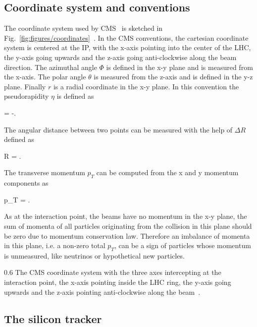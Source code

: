\subsection{Coordinate system and conventions}


The coordinate system used by CMS~\cite{Chatrchyan:2008zzk} is sketched in Fig.~\ref{fig:figures/coordinates}~\cite{Pantaleo:2293435}. In the CMS conventions, the cartesian coordinate system is centered at the IP, with the x-axis pointing into the center of the LHC, the y-axis going upwards and the z-axis going anti-clockwise along the beam direction. The azimuthal angle $\Phi$ is defined in the x-y plane and is measured from the x-axis. The polar angle $\theta$ is measured from the z-axis and is defined in the y-z plane. Finally $r$ is a radial coordinate in the x-y plane. In this convention the pseudorapidity $\eta$ is defined as

{
    \eta =  -\ln {}.
}

The angular distance between two points can be measured with the help of $\Delta R$ defined as

{
    \Delta R = .
}


The transverse momentum $p_{T}$ can be computed from the x and y momentum components as

{
    p_{T} =  .
}

As at the interaction point, the beams have no momentum in the x-y plane, the sum of momenta of all particles originating from the collision in this plane should be zero due to momentum conservation law. Therefore an imbalance of momenta in this plane, i.e. a non-zero total $p_{T}$, can be a sign of particles whose momentum is unmeasured, like neutrinos or hypothetical new particles. 

                 {0.6}       %
                 { The CMS coordinate system with the three axes intercepting at the interaction point, the x-axis pointing inside the LHC ring, the y-axis going upwards and the z-axis pointing anti-clockwise along the beam~\cite{Pantaleo:2293435}. }

\subsection{The silicon tracker~\label{sec:tracker}}

